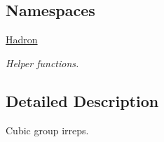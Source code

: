 \subsection*{Namespaces}
\begin{DoxyCompactItemize}
\item 
 \mbox{\hyperlink{namespaceHadron}{Hadron}}
\begin{DoxyCompactList}\small\item\em Helper functions. \end{DoxyCompactList}\end{DoxyCompactItemize}


\subsection{Detailed Description}
Cubic group irreps. 

